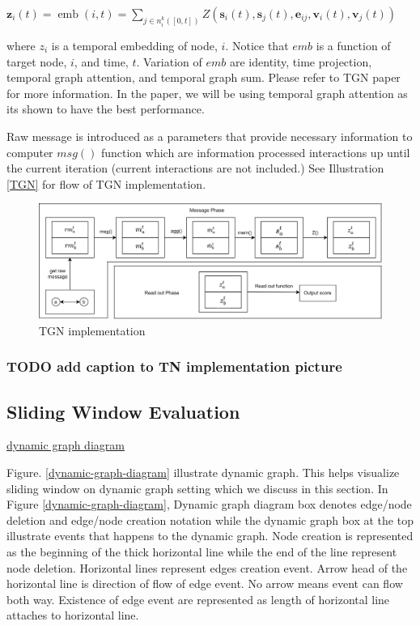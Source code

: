 \documentclass{IEEEtran}
\begin{document}
\(\mathbf{z}_{i}(t)=\operatorname{emb}(i, t)=\sum_{j \in n_{i}^{k}([0, t])} Z\left(\mathbf{s}_{i}(t), \mathbf{s}_{j}(t), \mathbf{e}_{i j}, \mathbf{v}_{i}(t), \mathbf{v}_{j}(t)\right)\)

where \(z_{i}\) is a temporal embedding of node, \(i\). Notice that \(emb\) is a function of target node, \(i\), and time, \(t\). Variation of \(emb\) are identity, time projection, temporal graph attention, and temporal graph sum. Please refer to TGN paper \cite{rossi2020temporal} for more information. In the paper, we will be using temporal graph attention as its shown to have the best performance.

Raw message is introduced as a parameters that provide necessary information to computer \(msg()\) function which are information processed interactions up until the current iteration (current interactions are not included.) See Illustration \ref{TGN} for flow of TGN implementation.

\begin{figure}[htbp]
\centering
\includegraphics[width=.9\linewidth]{./images/screenshot_20220405_133740.png}
\caption{\label{TGN implementation}TGN implementation}
\end{figure}

\subsubsection{{\bfseries\sffamily TODO} add caption to TN implementation picture}
\label{sec:org4289bbf}
\subsection{Sliding Window Evaluation}
\label{sec:orgdd8b18b}
\href{images/dynamic-graph-diagram.png}{dynamic graph diagram}


Figure. \ref{dynamic-graph-diagram} illustrate dynamic graph. This helps visualize sliding window on dynamic graph setting which we discuss in this section. In Figure \ref{dynamic-graph-diagram}, Dynamic graph diagram box denotes edge/node deletion and edge/node creation notation while the dynamic graph box at the top illustrate events that happens to the dynamic graph. Node creation is represented as the beginning of the thick horizontal line while the end of the line represent node deletion. Horizontal lines represent edges creation event. Arrow head of the horizontal line is direction of flow of edge event. No arrow means event can flow both way. Existence of edge event are represented as length of horizontal line attaches to horizontal line.
\end{document}
